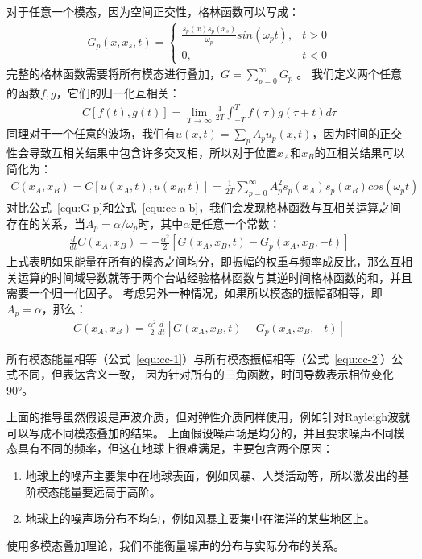 对于任意一个模态，因为空间正交性，格林函数可以写成\citep{snieder2015guided}：
\begin{align}
    G_p(x,x_s,t)=
    \begin{cases}
        \frac{s_p(x)s_p(x_s)}{\omega_p} sin(\omega_p t),   &  t >0  \\
        0 ,  &  t<0
    \end{cases}
    \label{equ:G-p}
\end{align}
完整的格林函数需要将所有模态进行叠加，$G=\sum\nolimits_{p=0}^\infty G_p$ \citep{gilbert1971excitation,haberman2013applied}。
我们定义两个任意的函数$f,g$，它们的归一化互相关：
\begin{align}
    C[f(t),g(t)] =  \lim_{T \rightarrow \infty} \frac{1}{2T} \int\nolimits_{-T}^{T} f(\tau)g(\tau+t) d\tau
    \label{equ:f-g-cc}
\end{align}
同理对于一个任意的波场，我们有$u(x,t)=\sum\nolimits_p A_p u_p(x,t)$，因为时间的正交性会导致互相关结果中包含许多交叉相，所以对于位置$x_A$和$x_B$的互相关结果可以简化为：
\begin{align}
    C(x_A,x_B) = C[u(x_A,t),u(x_B,t)] = \frac{1}{2T} \sum_{p=0}^\infty A_p^2 s_p(x_A) s_p(x_B) cos(\omega_p t)
    \label{equ:cc-a-b}
\end{align}
对比公式~\ref{equ:G-p}和公式~\ref{equ:cc-a-b}，我们会发现格林函数与互相关运算之间存在的关系，当$A_p = \alpha / \omega_p$时，其中$\alpha$是任意一个常数：
\begin{align}
    \frac{d}{dt}C(x_A,x_B) = - \frac{\alpha^2}{2} [G(x_A,x_B,t) - G_p(x_A,x_B,-t)]
    \label{equ:cc-1}
\end{align}
上式表明如果能量在所有的模态之间均分，即振幅的权重与频率成反比，那么互相关运算的时间域导数就等于两个台站经验格林函数与其逆时间格林函数的和，并且需要一个归一化因子。
考虑另外一种情况，如果所以模态的振幅都相等，即$A_p=\alpha$，那么：
\begin{align}
    C(x_A,x_B) = \frac{\alpha^2}{2} \frac{d}{dt} [G(x_A,x_B,t) - G_p(x_A,x_B,-t)]
    \label{equ:cc-2}
\end{align}

所有模态能量相等（公式~\ref{equ:cc-1}）与所有模态振幅相等（公式~\ref{equ:cc-2}）公式不同，但表达含义一致，
因为针对所有的三角函数，时间导数表示相位变化90°。

上面的推导虽然假设是声波介质，但对弹性介质同样使用，例如针对Rayleigh波就可以写成不同模态叠加的结果。
上面假设噪声场是均分的，并且要求噪声不同模态具有不同的频率，但这在地球上很难满足，主要包含两个原因：
\begin{enumerate}
    \item 地球上的噪声主要集中在地球表面，例如风暴、人类活动等，所以激发出的基阶模态能量要远高于高阶。
    \item 地球上的噪声场分布不均匀，例如风暴主要集中在海洋的某些地区上。
\end{enumerate}
使用多模态叠加理论，我们不能衡量噪声的分布与实际分布的关系。



